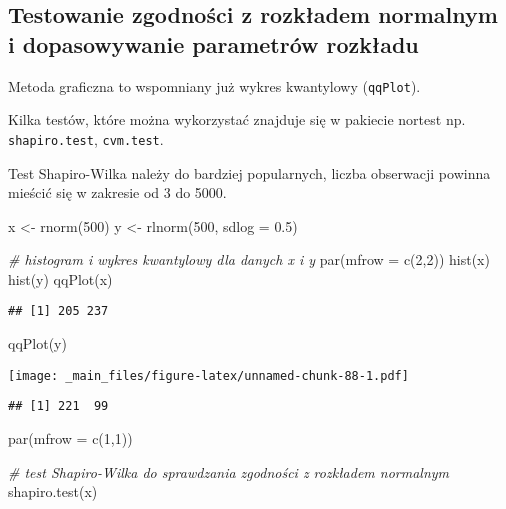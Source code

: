 \documentclass[
]{book}
\newenvironment{Shaded}{\begin{snugshade}}{\end{snugshade}}
\newcommand{\AttributeTok}[1]{\textcolor[rgb]{0.77,0.63,0.00}{#1}}
\newcommand{\CommentTok}[1]{\textcolor[rgb]{0.56,0.35,0.01}{\textit{#1}}}
\newcommand{\DecValTok}[1]{\textcolor[rgb]{0.00,0.00,0.81}{#1}}
\newcommand{\FloatTok}[1]{\textcolor[rgb]{0.00,0.00,0.81}{#1}}
\newcommand{\FunctionTok}[1]{\textcolor[rgb]{0.00,0.00,0.00}{#1}}
\newcommand{\NormalTok}[1]{#1}
\newcommand{\OtherTok}[1]{\textcolor[rgb]{0.56,0.35,0.01}{#1}}
\begin{document}
\hypertarget{testowanie-zgodnoux15bci-z-rozkux142adem-normalnym-i-dopasowywanie-parametruxf3w-rozkux142adu}{%
\subsection{Testowanie zgodności z rozkładem normalnym i dopasowywanie parametrów rozkładu}\label{testowanie-zgodnoux15bci-z-rozkux142adem-normalnym-i-dopasowywanie-parametruxf3w-rozkux142adu}}

Metoda graficzna to wspomniany już wykres kwantylowy (\texttt{qqPlot}).

Kilka testów, które można wykorzystać znajduje się w pakiecie nortest np. \texttt{shapiro.test}, \texttt{cvm.test}.

Test Shapiro-Wilka należy do bardziej popularnych, liczba obserwacji powinna mieścić się w zakresie od 3 do 5000.

\begin{Shaded}
\begin{Highlighting}[]
\NormalTok{x }\OtherTok{\textless{}{-}} \FunctionTok{rnorm}\NormalTok{(}\DecValTok{500}\NormalTok{)}
\NormalTok{y }\OtherTok{\textless{}{-}} \FunctionTok{rlnorm}\NormalTok{(}\DecValTok{500}\NormalTok{, }\AttributeTok{sdlog =} \FloatTok{0.5}\NormalTok{)}

\CommentTok{\# histogram i wykres kwantylowy dla danych x i y}
\FunctionTok{par}\NormalTok{(}\AttributeTok{mfrow =} \FunctionTok{c}\NormalTok{(}\DecValTok{2}\NormalTok{,}\DecValTok{2}\NormalTok{))}
\FunctionTok{hist}\NormalTok{(x)}
\FunctionTok{hist}\NormalTok{(y)}
\FunctionTok{qqPlot}\NormalTok{(x)}
\end{Highlighting}
\end{Shaded}

\begin{verbatim}
## [1] 205 237
\end{verbatim}

\begin{Shaded}
\begin{Highlighting}[]
\FunctionTok{qqPlot}\NormalTok{(y)}
\end{Highlighting}
\end{Shaded}

\texttt{[image: \_main\_files/figure-latex/unnamed-chunk-88-1.pdf]}

\begin{verbatim}
## [1] 221  99
\end{verbatim}

\begin{Shaded}
\begin{Highlighting}[]
\FunctionTok{par}\NormalTok{(}\AttributeTok{mfrow =} \FunctionTok{c}\NormalTok{(}\DecValTok{1}\NormalTok{,}\DecValTok{1}\NormalTok{))}

\CommentTok{\# test Shapiro{-}Wilka do sprawdzania zgodności z rozkładem normalnym}
\FunctionTok{shapiro.test}\NormalTok{(x)}
\end{Highlighting}
\end{Shaded}
\end{document}
